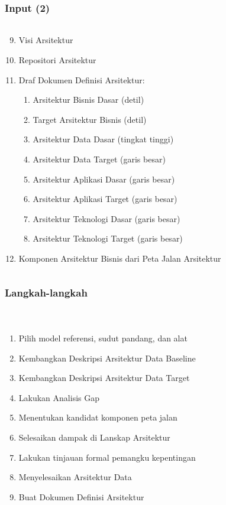 \documentclass[aspectratio=169, table]{beamer}
\begin{document}
	
	\begin{frame}
		\frametitle{Input (2)}
		\framesubtitle{\hspace{1cm}}
		\begin{columns}
			
			\begin{column}{1\textwidth}
				\begin{center}
					\begin{enumerate}
						\setcounter{enumi}{8}
						\item Visi Arsitektur
						\item Repositori Arsitektur
						\item Draf Dokumen Definisi Arsitektur:
						\begin{enumerate}
							\item Arsitektur Bisnis Dasar (detil)
							\item Target Arsitektur Bisnis (detil)
							\item Arsitektur Data Dasar (tingkat tinggi)
							\item Arsitektur Data Target (garis besar)
							\item Arsitektur Aplikasi Dasar (garis besar)
							\item Arsitektur Aplikasi Target (garis besar)
							\item Arsitektur Teknologi Dasar (garis besar)
							\item Arsitektur Teknologi Target (garis besar)
						\end{enumerate}
						\item Komponen Arsitektur Bisnis dari Peta Jalan Arsitektur
					\end{enumerate}
				\end{center}
			\end{column}
		\end{columns}
	\end{frame}
	
	
	\begin{frame}
		\frametitle{Langkah-langkah}\\
		\framesubtitle{\hspace{1cm}}
		\begin{enumerate}
			\item Pilih model referensi, sudut pandang, dan alat
			\item Kembangkan Deskripsi Arsitektur Data Baseline
			\item Kembangkan Deskripsi Arsitektur Data Target
			\item Lakukan Analisis Gap
			\item Menentukan kandidat komponen peta jalan
			\item Selesaikan dampak di Lanskap Arsitektur
			\item Lakukan tinjauan formal pemangku kepentingan
			\item Menyelesaikan Arsitektur Data
			\item Buat Dokumen Definisi Arsitektur
		\end{enumerate}
	\end{frame}
	
\end{document}
